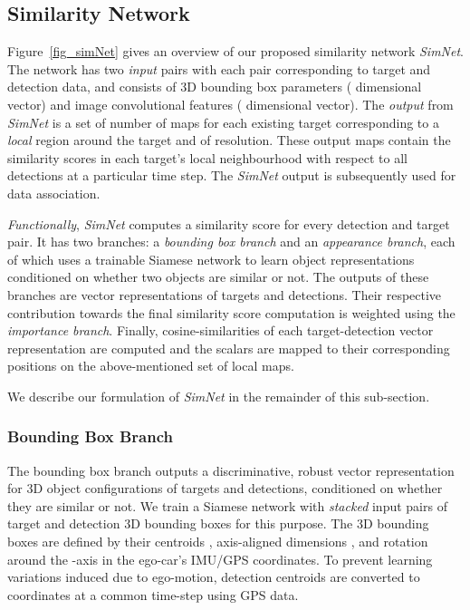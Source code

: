 \documentclass[letterpaper, 10 pt, conference]{ieeeconf}
\begin{document}
\subsection{Similarity Network}
Figure~\ref{fig_simNet} gives an overview of our proposed similarity network \textit{SimNet}. The network has two \textit{input} pairs with each pair corresponding to target and detection data, and consists of 3D bounding box parameters ( dimensional vector) and image convolutional features ( dimensional vector). The \textit{output} from \textit{SimNet} is a set of  number of maps for each existing target corresponding to a \textit{local}  region around the target and of  resolution. These output maps contain the similarity scores in each target's local neighbourhood with respect to all detections at a particular time step. The \textit{SimNet} output is subsequently used for data association. 
\par \textit{Functionally}, \textit{SimNet} computes a similarity score for every detection and target pair. It has two branches: a \textit{bounding box branch} and an \textit{appearance branch}, each of which uses a trainable Siamese network to learn object representations conditioned on whether two objects are similar or not. The outputs of these branches are vector representations of targets and detections. Their respective contribution towards the final similarity score computation is weighted using the \textit{importance branch}. Finally, cosine-similarities of each target-detection vector representation are computed and the scalars are mapped to their corresponding positions on the above-mentioned set of local maps. 
\par We describe our formulation of \textit{SimNet} in the remainder of this sub-section.

\subsubsection{Bounding Box Branch}
The bounding box branch outputs a discriminative, robust vector representation for 3D object configurations of targets and detections, conditioned on whether they are similar or not. We train a Siamese network with \textit{stacked} input pairs of target and detection 3D bounding boxes for this purpose. The 3D bounding boxes are defined by their centroids , axis-aligned dimensions , and rotation around the -axis   in the ego-car's IMU/GPS coordinates. To prevent learning variations induced due to ego-motion, detection centroids are converted to coordinates at a common time-step using GPS data. 
\end{document}
